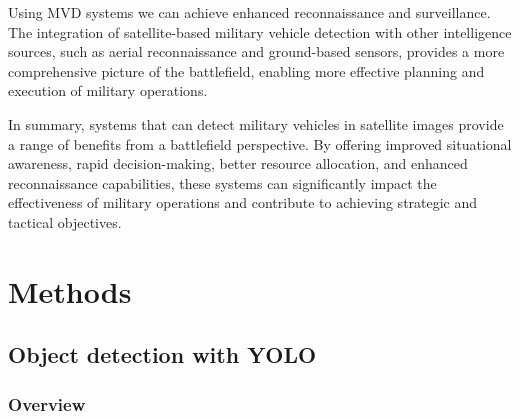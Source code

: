\documentclass[14pt,a4paper]{extarticle}
\newcounter{e}
\newcounter{pic}
\numberwithin{equation}{section}
\numberwithin{figure}{section}
\begin{document}
Using MVD systems we can achieve enhanced reconnaissance and surveillance. The integration of satellite-based military vehicle detection with other intelligence sources, such as aerial reconnaissance and ground-based sensors, provides a more comprehensive picture of the battlefield, enabling more effective planning and execution of military operations.

In summary, systems that can detect military vehicles in satellite images provide a range of benefits from a battlefield perspective. By offering improved situational awareness, rapid decision-making, better resource allocation, and enhanced reconnaissance capabilities, these systems can significantly impact the effectiveness of military operations and contribute to achieving strategic and tactical objectives.

\newpage
\thispagestyle{empty}
\section{Methods}

\subsection{Object detection with YOLO}

\subsubsection{Overview}
\end{document}
